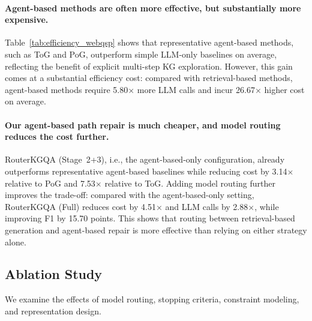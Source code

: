 \documentclass[11pt]{article}
\begin{document}
\paragraph{Agent-based methods are often more effective, but substantially more expensive.}
Table~\ref{tab:efficiency_webqsp} shows that representative agent-based methods, such as ToG and PoG, outperform simple LLM-only baselines on average, reflecting the benefit of explicit multi-step KG exploration. However, this gain comes at a substantial efficiency cost: compared with retrieval-based methods, agent-based methods require 5.80$\times$ more LLM calls and incur 26.67$\times$ higher cost on average.

\paragraph{Our agent-based path repair is much cheaper, and model routing reduces the cost further.}
RouterKGQA (Stage~2+3), i.e., the agent-based-only configuration, already outperforms representative agent-based baselines while reducing cost by 3.14$\times$ relative to PoG and 7.53$\times$ relative to ToG. Adding model routing further improves the trade-off: compared with the agent-based-only setting, RouterKGQA (Full) reduces cost by 4.51$\times$ and LLM calls by 2.88$\times$, while improving F1 by 15.70 points. This shows that routing between retrieval-based generation and agent-based repair is more effective than relying on either strategy alone.


\subsection{Ablation Study}
\label{sec:ablation}

We examine the effects of model routing, stopping criteria, constraint modeling, and representation design.
\end{document}

